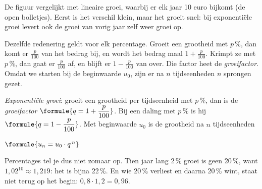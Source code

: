 De figuur vergelijkt met lineaire groei, waarbij er elk jaar 10 euro bijkomt (de open bolletjes). Eerst is het verschil klein, maar het groeit snel: bij exponentiële groei levert ook de groei van vorig jaar zelf weer groei op.

Dezelfde redenering geldt voor elk percentage. Groeit een grootheid met $p\,\%$, dan komt er $\tfrac{p}{100}$ van het bedrag bij, en wordt het bedrag maal $1 + \tfrac{p}{100}$. Krimpt ze met $p\,\%$, dan gaat er $\tfrac{p}{100}$ af, en blijft er $1 - \tfrac{p}{100}$ van over. Die factor heet de \textit{groeifactor}. Omdat we starten bij de beginwaarde $u_0$, zijn er na $n$ tijdseenheden $n$ sprongen gezet.

\begin{theorie}
\emph{Exponentiële groei}: groeit een grootheid per tijdseenheid met $p\,\%$, dan is de \emph{groeifactor} $\formule{q = 1 + \dfrac{p}{100}}$. Bij een daling met $p\,\%$ is hij $\formule{q = 1 - \dfrac{p}{100}}$. Met beginwaarde $u_0$ is de grootheid na $n$ tijdseenheden

\vspace{1mm}
\qquad $\formule{u_n = u_0 \cdot q^{\,n}}$
\end{theorie}

Percentages tel je dus niet zomaar op. Tien jaar lang 2\,\% groei is geen 20\,\%, want $1{,}02^{10} \approx 1{,}219$: het is bijna 22\,\%. En wie 20\,\% verliest en daarna 20\,\% wint, staat niet terug op het begin: $0{,}8 \cdot 1{,}2 = 0{,}96$.


